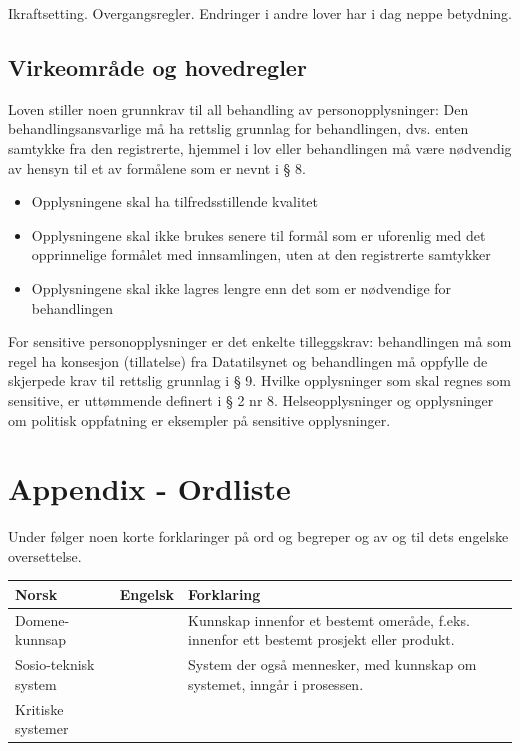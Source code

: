 \documentclass[11pt]{article}
\begin{document}
    Ikraftsetting. Overgangsregler. Endringer i andre lover har i dag neppe betydning.
\subsection{Virkeområde og hovedregler}
\label{sec-18.3}

   Loven stiller noen grunnkrav til all behandling av personopplysninger:
   Den behandlingsansvarlige må ha rettslig grunnlag for behandlingen, dvs. enten samtykke fra den registrerte, hjemmel i lov eller behandlingen må være nødvendig av hensyn til et av formålene som er nevnt i § 8.
\begin{itemize}
\item Opplysningene skal ha tilfredsstillende kvalitet
\item Opplysningene skal ikke brukes senere til formål som er uforenlig med det
     opprinnelige formålet med innsamlingen, uten at den registrerte samtykker
\item Opplysningene skal ikke lagres lengre enn det som er nødvendige for behandlingen
\end{itemize}

   For sensitive personopplysninger er det enkelte tilleggskrav:
   behandlingen må som regel ha konsesjon (tillatelse) fra Datatilsynet og behandlingen
   må oppfylle de skjerpede krav til rettslig grunnlag i § 9. Hvilke opplysninger som
   skal regnes som sensitive, er uttømmende definert i § 2 nr 8. Helseopplysninger og
   opplysninger om politisk oppfatning er eksempler på sensitive opplysninger.
\section{Appendix - Ordliste}
\label{sec-19}

  Under følger noen korte forklaringer på ord og begreper og av og til dets engelske oversettelse.

\begin{center}
\begin{tabular}{lll}
\hline
 \textbf{Norsk}        &  \textbf{Engelsk}  &  \textbf{Forklaring}                                                                        \\
\hline
 Domene-kunnsap        &                    &  Kunnskap innenfor et bestemt omeråde, f.eks. innenfor ett bestemt prosjekt eller produkt.  \\
 Sosio-teknisk system  &                    &  System der også mennesker, med kunnskap om systemet, inngår i prosessen.                   \\
 Kritiske systemer     &                    &                                                                                             \\
\hline
\end{tabular}
\end{center}
\end{document}
